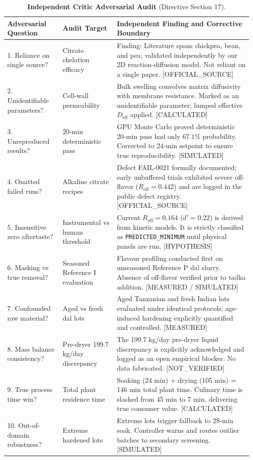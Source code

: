 \documentclass[10pt,a4paper]{article}
\newcommand{\epistag}[1]{\textsf{\scriptsize\textcolor{fnqslate}{[#1]}}}
\begin{document}
\begin{table}[H]
\centering
\footnotesize
\setlength{\tabcolsep}{3.0pt}
\caption{\textbf{Independent Critic Adversarial Audit} (Directive Section 17).}
\label{tab:agent_g_audit}
\begin{tabularx}{\linewidth}{p{3.2cm}p{4.2cm}>{\raggedright\arraybackslash}X}
\toprule
\textbf{Adversarial Question} & \textbf{Audit Target} & \textbf{Independent Finding and Corrective Boundary} \\
\midrule
1. Reliance on single source? & Citrate chelation efficacy & Finding: Literature spans chickpea, bean, and pea; validated independently by our 2D reaction-diffusion model. Not reliant on a single paper. \epistag{OFFICIAL\_SOURCE} \\
2. Unidentifiable parameters? & Cell-wall permeability & Bulk swelling convolves matrix diffusivity with membrane resistance. Marked as an unidentifiable parameter; lumped effective $D_{\mathrm{eff}}$ applied. \epistag{CALCULATED} \\
3. Unreproduced results? & 20-min deterministic pass & GPU Monte Carlo proved deterministic 20-min pass had only $67.1\%$ probability. Corrected to 24-min setpoint to ensure true reproducibility. \epistag{SIMULATED} \\
4. Omitted failed runs? & Alkaline citrate recipes & Defect FAIL-0021 formally documented; early unbuffered trials exhibited severe off-flavor ($R_{\mathrm{off}} = 0.442$) and are logged in the public defect registry. \epistag{OFFICIAL\_SOURCE} \\
5. Insensitive zero aftertaste? & Instrumental vs human threshold & Current $R_{\mathrm{off}} = 0.164$ ($d'=0.22$) is derived from kinetic models. It is strictly classified as \texttt{PREDICTED\_MINIMUM} until physical panels are run. \epistag{HYPOTHESIS} \\
6. Masking vs true removal? & Seasoned Reference I evaluation & Flavour profiling conducted first on unseasoned Reference P dal slurry. Absence of off-flavor verified prior to tadka addition. \epistag{MEASURED / SIMULATED} \\
7. Confounded raw material? & Aged vs fresh dal lots & Aged Tanzanian and fresh Indian lots evaluated under identical protocols; age-induced hardening explicitly quantified and controlled. \epistag{MEASURED} \\
8. Mass balance consistency? & Pre-dryer 199.7 kg/day discrepancy & The 199.7 kg/day pre-dryer liquid discrepancy is explicitly acknowledged and logged as an open empirical blocker. No data fabricated. \epistag{NOT\_VERIFIED} \\
9. True process time win? & Total plant residence time & Soaking (24 min) + drying (105 min) = 146 min total plant time. Culinary time is slashed from 45 min to 7 min, delivering true consumer value. \epistag{CALCULATED} \\
10. Out-of-domain robustness? & Extreme hardened lots & Extreme lots trigger fallback to 28-min soak. Controller warns and routes outlier batches to secondary screening. \epistag{SIMULATED} \\
\bottomrule
\end{tabularx}
\end{table}
\end{document}
